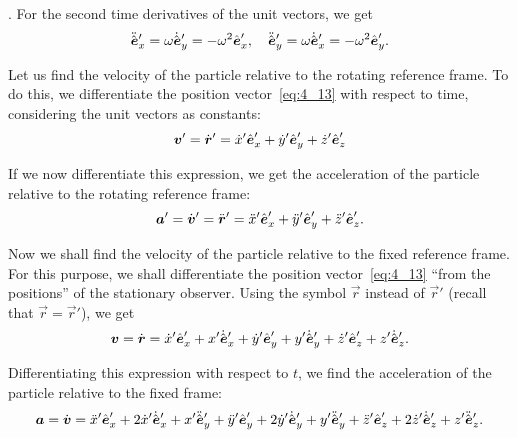 . For the second time derivatives of the unit vectors, we get
\begin{equation}\label{eq:4_15}
\ddot{\hat{\boldsymbol{e}}}_x' = \omega\dot{\hat{\boldsymbol{e}}}_y' = -\omega^2\hat{\boldsymbol{e}}_{x}',\quad \ddot{\hat{\boldsymbol{e}}}_y' = \omega\dot{\hat{\boldsymbol{e}}}_x' = -\omega^2\hat{\boldsymbol{e}}_{y}'.
\end{equation}

Let us find the velocity of the particle relative to the rotating reference frame. To do this, we differentiate the position vector~\eqref{eq:4_13} with respect to time, considering the unit vectors as constants:
\begin{equation}\label{eq:4_16}
\boldsymbol{v}' = \dot{\boldsymbol{r}}' = \dot{x}'\hat{\boldsymbol{e}}_{x}' + \dot{y}'\hat{\boldsymbol{e}}_{y}' + \dot{z}'\hat{\boldsymbol{e}}_{z}'
\end{equation}

\noindent
If we now differentiate this expression, we get the acceleration of the particle relative to the rotating reference frame:
\begin{equation}\label{eq:4_17}
\boldsymbol{a}' = \dot{\boldsymbol{v}}' = \ddot{\boldsymbol{r}}' = \ddot{x}'\hat{\boldsymbol{e}}_{x}' + \ddot{y}'\hat{\boldsymbol{e}}_{y}' + \ddot{z}'\hat{\boldsymbol{e}}_{z}'.
\end{equation}

Now we shall find the velocity of the particle relative to the fixed reference frame. For this purpose, we shall differentiate the position vector~\eqref{eq:4_13} ``from the positions'' of the stationary observer. Using the symbol $\vec{r}$ instead of $\vec{r}'$ (recall that $\vec{r}=\vec{r}'$), we get
\begin{equation}\label{eq:4_18}
\boldsymbol{v} = \dot{\boldsymbol{r}} = \dot{x}'\hat{\boldsymbol{e}}_{x}' + x'\dot{\hat{\boldsymbol{e}}}_x' + \dot{y}'\hat{\boldsymbol{e}}_{y}' + y'\dot{\hat{\boldsymbol{e}}}_y' + \dot{z}'\hat{\boldsymbol{e}}_{z}' + z'\dot{\hat{\boldsymbol{e}}}_z'.
\end{equation}

\noindent
Differentiating this expression with respect to $t$, we find the acceleration of the particle relative to the fixed frame:
\begin{equation*}
\boldsymbol{a} = \dot{\boldsymbol{v}} = 
\ddot{x}'\hat{\boldsymbol{e}}_{x}' + 2\dot{x}'\dot{\hat{\boldsymbol{e}}}_x' + x'\ddot{\hat{\boldsymbol{e}}}_y' + \ddot{y}'\hat{\boldsymbol{e}}_{y}' + 2\dot{y}'\dot{\hat{\boldsymbol{e}}}_y' + y'\ddot{\hat{\boldsymbol{e}}}_y' + \ddot{z}'\hat{\boldsymbol{e}}_{z}' + 2\dot{z}'\dot{\hat{\boldsymbol{e}}}_z' + z'\ddot{\hat{\boldsymbol{e}}}_z'.
\end{equation*}


